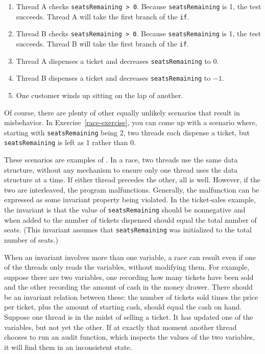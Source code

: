 \begin{enumerate}
\item
Thread A checks \verb|seatsRemaining > 0|.  Because
\verb|seatsRemaining| is 1, the test succeeds.  Thread A will take the
first branch of the \verb|if|.
\item
Thread B checks \verb|seatsRemaining > 0|.  Because
\verb|seatsRemaining| is 1, the test succeeds.  Thread B will take the
first branch of the \verb|if|.
\item
Thread A dispenses a ticket and decreases \verb|seatsRemaining| to 0.
\item
Thread B dispenses a ticket and decreases \verb|seatsRemaining| to $-1$.
\item
One customer winds up sitting on the lap of another.
\end{enumerate}

Of course, there are plenty of other equally unlikely scenarios that
result in misbehavior.  In Exercise~\ref{race-exercise}, you can come
up with a scenario
where, starting with \verb|seatsRemaining| being 2, two threads each
dispense a ticket, but \verb|seatsRemaining| is left as 1 rather than
0.

These scenarios are examples of .  In a race, 
two threads use the same data structure, without any mechanism to
ensure only one thread uses the data structure at a time.  If either thread precedes the
other, all is well.  However, if the two are interleaved, the program
malfunctions.  Generally, the malfunction can be expressed as some
invariant property being violated.  In the ticket-sales example, the
invariant is that the value of \verb|seatsRemaining|
should be nonnegative and when added to
the number
of tickets dispensed should equal the total number of seats.
(This invariant assumes that \verb|seatsRemaining| was initialized to
the total number of seats.)

When an invariant involves more than one variable, a race can result
even if one of the threads only reads the variables, without modifying
them.  For example, suppose there are two variables, one recording how
many tickets have been sold and the other recording the amount of
cash in the money drawer.  There should be an invariant relation between
these: the number of tickets sold times the price per ticket, plus the
amount of starting cash, should equal the cash on hand.  Suppose one
thread is in the midst of selling a ticket.  It has updated one of the
variables, but not yet the other.  If at exactly that moment another
thread chooses to run an audit function, which inspects the values of
the two variables, it will find them in an inconsistent state.


